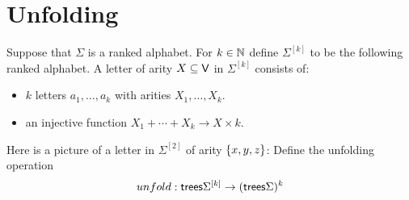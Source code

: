 \section{Unfolding}

Suppose that $\Sigma$ is a ranked alphabet. For $k \in {\mathbb N}$ define $\Sigma^{[k]}$ to be the following ranked alphabet. A letter of arity $X \subseteq \mathsf V$ in $\Sigma^{[k]}$ consists of:
\begin{itemize}
    \item $k$ letters $a_1,\ldots,a_k$ with arities $X_1,\ldots,X_k$.
    \item an injective function $X_1 + \cdots + X_k \to X \times k$.
\end{itemize}
Here is a picture of a letter in $\Sigma^{[2]}$ of arity $\{x,y,z\}$:
Define the unfolding operation 
\begin{align*}
    unfold : \mathsf {trees} {\Sigma^{[k]}} \to (\mathsf {trees} \Sigma)^k
\end{align*}
